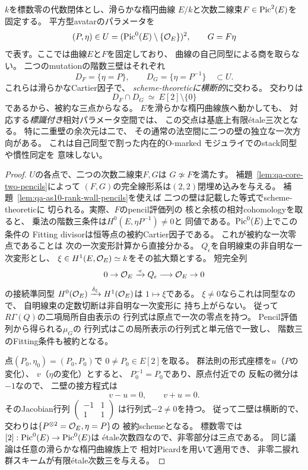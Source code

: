\begin{proposition}[滑らかなavatarにおける二重壁の横断性]
\label{prop:qa-as10-double-wall-transversality}
$k$を標数零の代数閉体とし、滑らかな楕円曲線
$E/k$と次数二線束$F\in\operatorname{Pic}^2(E)$を固定する。
平方型avatarのパラメータを
\[
 (P,\eta)\in
 U=(\operatorname{Pic}^0(E)\setminus\{\mathcal O_E\})^2,
 \qquad G=F\eta
\]
で表す。ここでは曲線$E$と$F$を固定しており、
曲線の自己同型による商を取らない。
二つのmutationの階数三壁はそれぞれ
\[
 D_F=\{\eta=P\},\qquad
 D_G=\{\eta=P^{-1}\}\quad\subset U .
\]
これらは滑らかなCartier因子で、
\emph{scheme-theoreticに横断的}に交わる。
交わりは
\[
 D_F\cap D_G
 \ \simeq\ E[2]\setminus\{0\}
\]
であるから、被約な三点からなる。
$E$を滑らかな楕円曲線族へ動かしても、
対応する\emph{標識付き}相対パラメータ空間では、
この交点は基底上有限étale三次となる。
特に二重壁の余次元は二で、
その通常の法空間に二つの壁の独立な一次方向がある。
これは自己同型で割った内在的O-marked
モジュライでのstack同型や慣性同定を
意味しない。
\end{proposition}
\begin{proof}
$U$の各点で、二つの次数二線束$F,G$は
$G\not\simeq F$を満たす。
補題~\ref{lem:qa-core-two-pencils}によって
$(F,G)$の完全線形系は$(2,2)$閉埋め込みを与える。
補題~\ref{lem:qa-as10-rank-wall-pencils}を使えば
二つの壁は記載した等式でscheme-theoreticに
切られる。実際、$F$のpencil評価列の
核と余核の相対cohomologyを取ると、
乗法の階数三条件は$H^0(E,\eta P^{-1})\ne0$と
同値である。$\operatorname{Pic}^0(E)$上でこの条件の
Fitting divisorは恒等点の被約Cartier因子である。
これが被約な一次零点であることは
次の一次変形計算から直接分かる。
$Q_\epsilon$を自明線束の非自明な一次変形とし、
$\xi\in H^1(E,\mathcal O_E)\simeq k$をその拡大類とする。
短完全列
\[
 0\to\mathcal O_E\xrightarrow{\cdot\epsilon}
 Q_\epsilon\longrightarrow\mathcal O_E\to0
\]
の接続準同型
$H^0(\mathcal O_E)\xrightarrow{\delta_\xi}H^1(\mathcal O_E)$は
$1\mapsto\xi$である。
$\xi\ne0$ならこれは同型なので、
自明線束の定数切断は非自明な一次変形に
持ち上がらない。
従って$R\Gamma(Q)$の二項局所自由表示の
行列式は原点で一次の零点を持つ。
Pencil評価列から得られる$\mu_G$の
行列式はこの局所表示の行列式と単元倍で一致し、
階数三のFitting条件も被約となる。

点$(P_0,\eta_0)=(P_0,P_0)$で
$0\ne P_0\in E[2]$を取る。
群法則の形式座標を$u$（$P$の変化）、
$v$（$\eta$の変化）とすると、
$P_0^{-1}=P_0$であり、原点付近での
反転の微分は$-1$なので、
二壁の接方程式は
\[
 v-u=0,\qquad v+u=0.
\]
そのJacobian行列
$\left(\begin{smallmatrix}-1&1\\1&1\end{smallmatrix}\right)$
は行列式$-2\ne0$を持つ。
従って二壁は横断的で、
交わりは$\{P^{\otimes2}=\mathcal O_E,\eta=P\}$の
被約schemeとなる。
標数零では$[2]:\operatorname{Pic}^0(E)\to\operatorname{Pic}^0(E)$は
étale次数四なので、非零部分は三点である。
同じ議論は任意の滑らかな楕円曲線族上で
相対Picardを用いて適用でき、
非零二捩れ群スキームが有限étale次数三を与える。
\end{proof}


